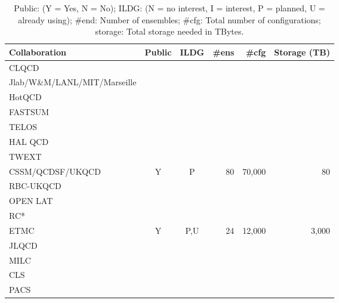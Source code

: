 \documentclass[a4paper,11pt]{article}
\begin{document}
\begin{table}[h]
  \caption{ Public: (Y = Yes, N = No); ILDG: (N = no interest, I =
    interest, P = planned, U = already using); \#end: Number of
    ensembles; \#cfg: Total number of configurations; storage: Total
    storage needed in TBytes.
    \label{tab:summary}
  }
  \centering
  \begin{tabular}{lccrrr}\hline\hline
    Collaboration                & Public & ILDG & \#ens & \#cfg & Storage (TB) \\\hline
    CLQCD                        &        &      &       &       &              \\
    Jlab/W\&M/LANL/MIT/Marseille &        &      &       &       &              \\
    HotQCD                       &        &      &       &       &              \\
    FASTSUM                      &        &      &       &       &              \\
    TELOS                        &        &      &       &       &              \\
    HAL QCD                      &        &      &       &       &              \\
    TWEXT                        &        &      &       &       &              \\
    CSSM/QCDSF/UKQCD             &    Y   &  P   &  80   &70,000 &  80          \\
    RBC-UKQCD                    &        &      &       &       &              \\
    OPEN LAT                     &        &      &       &       &              \\
    RC*                          &        &      &       &       &              \\
    ETMC                         &    Y   &  P,U &  24   &12,000 & 3,000        \\
    JLQCD                        &        &      &       &       &              \\
    MILC                         &        &      &       &       &              \\
    CLS                          &        &      &       &       &              \\
    PACS                         &        &      &       &       &              \\\hline\hline
  \end{tabular}
\end{table}
\end{document}
